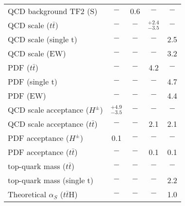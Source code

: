 {\begin{tabular}{lcccc}
QCD background TF2 (S)             & $-$              & 0.6            & $-$              & $-$           \\ 
QCD scale ($t\bar{t}$)               & $-$              & $-$            & $_{-3.5}^{+2.4}$ & $-$           \\ 
QCD scale (single t)               & $-$              & $-$            & $-$              & 2.5           \\ 
QCD scale (EW)                     & $-$              & $-$            & $-$              & 3.2           \\ 
PDF ($t\bar{t}$)                     & $-$              & $-$            & 4.2              & $-$           \\ 
PDF (single t)                     & $-$              & $-$            & $-$              & 4.7           \\ 
PDF (EW)                           & $-$              & $-$            & $-$              & 4.4           \\ 
QCD scale acceptance ($H^{\pm}$)     & $_{-3.5}^{+4.9}$ & $-$            & $-$              & $-$           \\ 
QCD scale acceptance ($t\bar{t}$)    & $-$              & $-$            & 2.1              & 2.1           \\ 
PDF acceptance ($H^{\pm}$)           & 0.1              & $-$            & $-$              & $-$           \\ 
PDF acceptance ($t\bar{t}$)          & $-$              & $-$            & 0.1              & 0.1           \\ 
top-quark mass ($t\bar{t}$)          & $-$              & $-$            & $-$              & $-$           \\ 
top-quark mass (single t)          & $-$              & $-$            & $-$              & 2.2           \\ 
Theoretical $\alpha_{S}$ ($t\bar{t}$H) & $-$              & $-$            & $-$              & 1.0           \\ 

\hline
\end{tabular}
}
\renewcommand{\arraystretch}{1}
